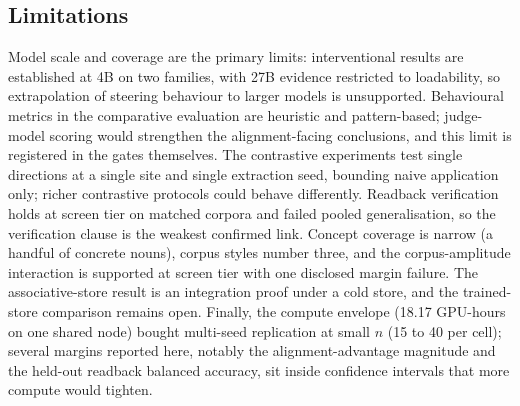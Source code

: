 \subsection{Limitations}
\label{sec:limitations}

Model scale and coverage are the primary limits: interventional results are established at 4B on two families, with 27B evidence restricted to loadability, so extrapolation of steering behaviour to larger models is unsupported. Behavioural metrics in the comparative evaluation are heuristic and pattern-based; judge-model scoring would strengthen the alignment-facing conclusions, and this limit is registered in the gates themselves. The contrastive experiments test single directions at a single site and single extraction seed, bounding naive application only; richer contrastive protocols could behave differently. Readback verification holds at screen tier on matched corpora and failed pooled generalisation, so the verification clause is the weakest confirmed link. Concept coverage is narrow (a handful of concrete nouns), corpus styles number three, and the corpus-amplitude interaction is supported at screen tier with one disclosed margin failure. The associative-store result is an integration proof under a cold store, and the trained-store comparison remains open. Finally, the compute envelope (18.17 GPU-hours on one shared node) bought multi-seed replication at small $n$ (15 to 40 per cell); several margins reported here, notably the alignment-advantage magnitude and the held-out readback balanced accuracy, sit inside confidence intervals that more compute would tighten.
